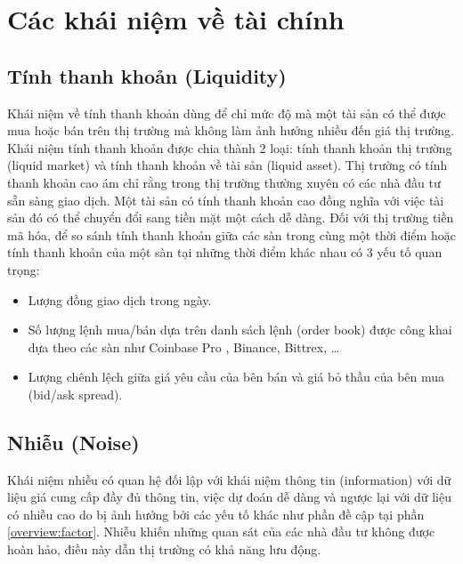 \section{Các khái niệm về tài chính}
\subsection{Tính thanh khoản (Liquidity)}

Khái niệm về tính thanh khoản dùng để chỉ mức độ mà một tài sản có thể được mua hoặc bán trên thị trường mà không làm ảnh hưởng nhiều đến giá thị trường.
Khái niệm tính thanh khoản được chia thành 2 loại: tính thanh khoản thị trường (liquid market) và tính thanh khoản về tài sản (liquid asset). Thị trường có tính thanh khoản cao ám chỉ rằng trong thị trường thường xuyên có các nhà đầu tư sẵn sàng giao dịch. Một tài sản có tính thanh khoản cao đồng nghĩa với việc tài sản đó có thể chuyển đổi sang tiền mặt một cách dễ dàng. Đối với thị trường tiền mã hóa, để so sánh tính thanh khoản giữa các sàn trong cùng một thời điểm hoặc tính thanh khoản của một sàn tại những thời điểm khác nhau có 3 yếu tố quan trọng: 
\begin{itemize}
	\item Lượng đồng giao dịch trong ngày.
	\item Số lượng lệnh mua/bán dựa trên danh sách lệnh (order book) được công khai dựa theo các sàn như Coinbase Pro \cite{live-order-book}, Binance, Bittrex, \dots
	\item Lượng chênh lệch giữa giá yêu cầu của bên bán và giá bỏ thầu của bên mua (bid/ask spread).
\end{itemize}

\subsection{Nhiễu (Noise)} \label{concept:finance:noise}
Khái niệm nhiễu có quan hệ đối lập với khái niệm thông tin (information) với dữ liệu giá cung cấp đầy đủ thông tin, việc dự đoán dễ dàng và ngược lại với dữ liệu có nhiễu cao do bị ảnh hưởng bởi các yếu tố khác như phần đề cập tại phần \ref{overview:factor}. Nhiễu khiến những quan sát của các nhà đầu tư không được hoàn hảo, điều này dẫn thị trường có khả năng lưu động\cite{noise-in-finance}.

